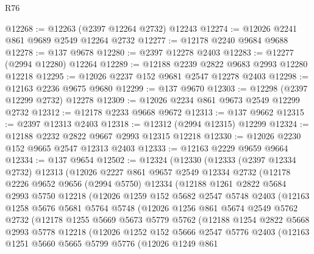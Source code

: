 \begin{lexlean}{R76}
\begin{coremodule}
@12268 := @12263 (@2397 @12264 @2732) @12243
@12274 := @12026 @2241 @861 @9689 @2549 @12264 @2732
@12277 := @12178 @2240 @9684 @9688
@12278 := @137 @9678
@12280 := @2397 @12278 @2403
@12283 := @12277 (@2994 @12280) @12264
@12289 := @12188 @2239 @2822 @9683 @2993 @12280 @12218
@12295 := @12026 @2237 @152 @9681 @2547 @12278 @2403
@12298 := @12163 @2236 @9675 @9680
@12299 := @137 @9670
@12303 := @12298 (@2397 @12299 @2732) @12278
@12309 := @12026 @2234 @861 @9673 @2549 @12299 @2732
@12312 := @12178 @2233 @9668 @9672
@12313 := @137 @9662
@12315 := @2397 @12313 @2403
@12318 := @12312 (@2994 @12315) @12299
@12324 := @12188 @2232 @2822 @9667 @2993 @12315 @12218
@12330 := @12026 @2230 @152 @9665 @2547 @12313 @2403
@12333 := @12163 @2229 @9659 @9664
@12334 := @137 @9654
@12502 := @12324
    (@12330
      (@12333
        (@2397 @12334 @2732)
        @12313
        (@12026
          @2227
          @861
          @9657
          @2549
          @12334
          @2732
          (@12178
            @2226
            @9652
            @9656
            (@2994 @5750)
            @12334
            (@12188
              @1261
              @2822
              @5684
              @2993
              @5750
              @12218
              (@12026
                @1259
                @152
                @5682
                @2547
                @5748
                @2403
                (@12163
                  @1258
                  @5676
                  @5681
                  @5764
                  @5748
                  (@12026
                    @1256
                    @861
                    @5674
                    @2549
                    @5762
                    @2732
                    (@12178
                      @1255
                      @5669
                      @5673
                      @5779
                      @5762
                      (@12188
                        @1254
                        @2822
                        @5668
                        @2993
                        @5778
                        @12218
                        (@12026
                          @1252
                          @152
                          @5666
                          @2547
                          @5776
                          @2403
                          (@12163
                            @1251
                            @5660
                            @5665
                            @5799
                            @5776
                            (@12026
                              @1249
                              @861

\end{coremodule}
\end{lexlean}
